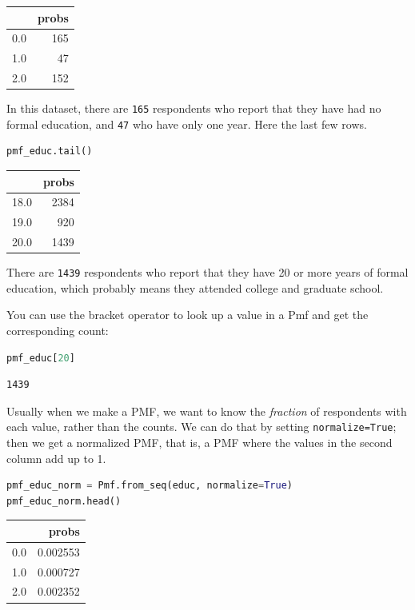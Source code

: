 \begin{tabular}{lr}
\toprule
{} &  probs \\
\midrule
0.0 &    165 \\
1.0 &     47 \\
2.0 &    152 \\
\bottomrule
\end{tabular}

In this dataset, there are \passthrough{\lstinline!165!} respondents who
report that they have had no formal education, and
\passthrough{\lstinline!47!} who have only one year. Here the last few
rows.

\begin{lstlisting}[language=Python]
pmf_educ.tail()
\end{lstlisting}

\begin{tabular}{lr}
\toprule
{} &  probs \\
\midrule
18.0 &   2384 \\
19.0 &    920 \\
20.0 &   1439 \\
\bottomrule
\end{tabular}

There are \passthrough{\lstinline!1439!} respondents who report that
they have 20 or more years of formal education, which probably means
they attended college and graduate school.

You can use the bracket operator to look up a value in a Pmf and get the
corresponding count:

\begin{lstlisting}[language=Python]
pmf_educ[20]
\end{lstlisting}

\begin{lstlisting}[]
1439
\end{lstlisting}

Usually when we make a PMF, we want to know the \emph{fraction} of
respondents with each value, rather than the counts. We can do that by
setting \passthrough{\lstinline!normalize=True!}; then we get a
normalized PMF, that is, a PMF where the values in the second column add
up to 1.

\begin{lstlisting}[language=Python]
pmf_educ_norm = Pmf.from_seq(educ, normalize=True)
pmf_educ_norm.head()
\end{lstlisting}

\begin{tabular}{lr}
\toprule
{} &     probs \\
\midrule
0.0 &  0.002553 \\
1.0 &  0.000727 \\
2.0 &  0.002352 \\
\bottomrule
\end{tabular}


